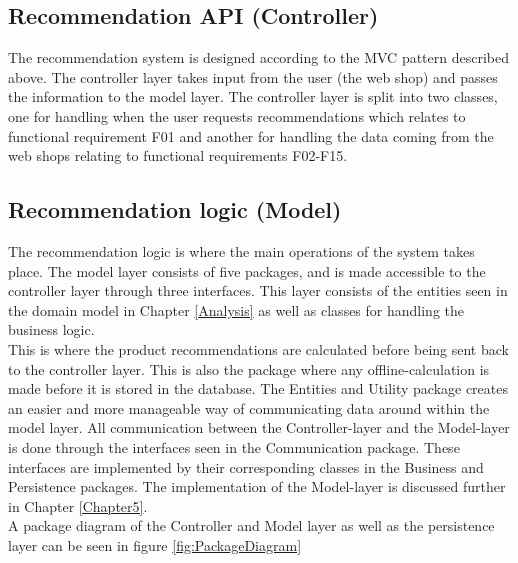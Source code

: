 \subsection{Recommendation API (Controller)}
The recommendation system is designed according to the MVC pattern described above. The controller layer takes input from the user (the web shop) and passes the information to the model layer. The controller layer is split into two classes, one for handling when the user requests recommendations which relates to functional requirement F01 and another for handling the data coming from the web shops relating to functional requirements F02-F15.

\subsection{Recommendation logic (Model)}
The recommendation logic is where the main operations of the system takes place. The model layer consists of five packages, and is made accessible to the controller layer through three interfaces. This layer consists of the entities seen in the domain model in Chapter \ref{Analysis} as well as classes for handling the business logic. \\This is where the product recommendations are calculated before being sent back to the controller layer. This is also the package where any offline-calculation is made before it is stored in the database. The Entities and Utility package creates an easier and more manageable way of communicating data around within the model layer. All communication between the Controller-layer and the Model-layer is done through the interfaces seen in the Communication package. These interfaces are implemented by their corresponding classes in the Business and Persistence packages. The implementation of the Model-layer is discussed further in Chapter \ref{Chapter5}. \\
A package diagram of the Controller and Model layer as well as the persistence layer can be seen in figure \ref{fig:PackageDiagram}

